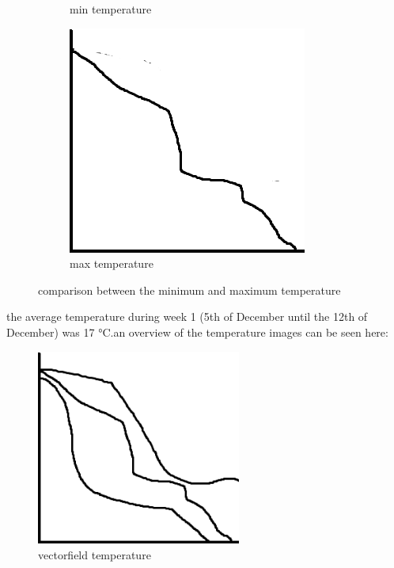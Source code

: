 \begin{figure}[hbt!]
\begin{subfigure}{0.3\textwidth}
\caption{min temperature}  
\end{subfigure} 
\begin{subfigure}{0.3\textwidth} 
\includegraphics[width=0.9\linewidth]{reports/current_report/images/average_graph_temperature.png}  
\caption{max temperature}  
\end{subfigure} 
\caption{comparison between the minimum and maximum temperature}  
\end{figure} 
\FloatBarrier  
the average temperature during week 1 (5th of December until the 12th of December) was 17 °C.an overview of the temperature images can be seen here:\begin{figure}
\includegraphics[width=0.6\textwidth]{reports/current_report/images/combined_graph_temperature.png}  
\caption{vectorfield temperature}  
\end{figure} 
\FloatBarrier  
